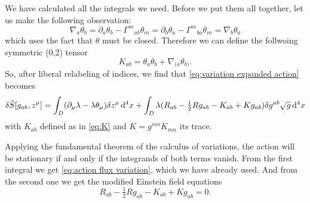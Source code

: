 \documentclass[../main.tex]{subfiles}
\begin{document}
We have calculated all the integrals we need. Before we put them all together, let us make
the following observation:
\begin{equation*}
	\nabla_a \theta_b = \partial_a \theta_b - {\Gamma^m}_{ab} \theta_m = \partial_b \theta_a
	- {\Gamma^m}_{ba} \theta_m = \nabla_b \theta_a
\end{equation*}
which uses the fact that \( \theta \) must be closed. Therefore we can define the
follwoing symmetric (0,2) tensor
\begin{equation} \label{eq:K}
	K_{ab} = \theta_a\theta_b + \nabla_{(a}\theta_{b)}. 
\end{equation}
So, after liberal relabeling of indices, we find that \cref{eq:variation expanded action}
becomes
\begin{equation} \label{eq:final variation of action}
	\delta\tilde{S}[g_{ab}, z^\mu] = \int_D(\partial_\mu \lambda - \lambda \theta_\mu)
	\delta z^\mu \,\mathrm{d}^4 x + \int_D \lambda (R_{ab} - \tfrac{1}{2} Rg_{ab} - K_{ab} +
	Kg_{ab})\delta g^{ab} \sqrt{g} \,\mathrm{d}^4 x
\end{equation}
with \( K_{ab} \) defined as in \cref{eq:K} and \( K = g^{mn}K_{mn} \) its trace. 

Applying the fundamental theorem of the calculus of variations, the action will be
stationary if and only if the integrands of both terms vanish. From the first integral we
get \cref{eq:action flux variation}, which we have already used. And from the second one
we get the modified Einstein field equations
\begin{equation} \label{eq:modified EFE}
	R_{ab} - \tfrac{1}{2}Rg_{ab} - K_{ab} + Kg_{ab} = 0.
\end{equation}
\end{document}
